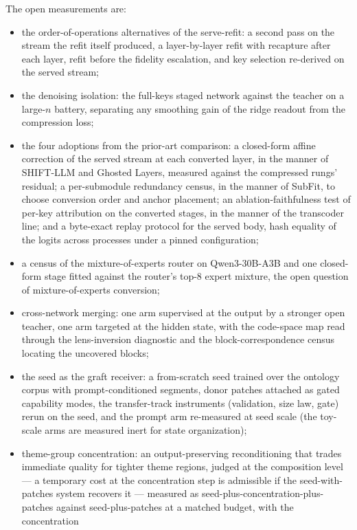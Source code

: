 \documentclass[11pt]{article}
\begin{document}
The open measurements are:
\begin{itemize}
\item the order-of-operations alternatives of the serve-refit:
  a second pass on the stream the refit itself produced, a
  layer-by-layer refit with recapture after each layer, refit
  before the fidelity escalation, and key selection re-derived
  on the served stream;
\item the denoising isolation: the full-keys staged network
  against the teacher on a large-$n$ battery, separating any
  smoothing gain of the ridge readout from the compression
  loss;
\item the four adoptions from the prior-art comparison: a
  closed-form affine correction of the served stream at each
  converted layer, in the manner of SHIFT-LLM and Ghosted Layers,
  measured against the compressed rungs' residual; a
  per-submodule redundancy census, in the manner of SubFit, to
  choose conversion order and anchor placement; an
  ablation-faithfulness test of per-key attribution on the
  converted stages, in the manner of the transcoder line; and a
  byte-exact replay protocol for the served body, hash equality of
  the logits across processes under a pinned configuration;
\item a census of the mixture-of-experts router on Qwen3-30B-A3B
  and one closed-form stage fitted against the router's top-8
  expert mixture, the open question of mixture-of-experts
  conversion;
\item cross-network merging: one arm supervised at the output by a
  stronger open teacher, one arm targeted at the hidden state, with
  the code-space map read through the lens-inversion diagnostic and
  the block-correspondence census locating the uncovered blocks;
\item the seed as the graft receiver: a from-scratch seed trained
  over the ontology corpus with prompt-conditioned segments,
  donor patches attached as gated capability modes, the
  transfer-track instruments (validation, size law, gate) rerun
  on the seed, and the prompt arm re-measured at seed scale (the
  toy-scale arms are measured inert for state organization);
\item theme-group concentration: an output-preserving
  reconditioning that trades immediate quality for tighter theme
  regions, judged at the composition level --- a temporary cost
  at the concentration step is admissible if the
  seed-with-patches system recovers it --- measured as
  seed-plus-concentration-plus-patches against
  seed-plus-patches at a matched budget, with the concentration

\end{itemize}
\end{document}

